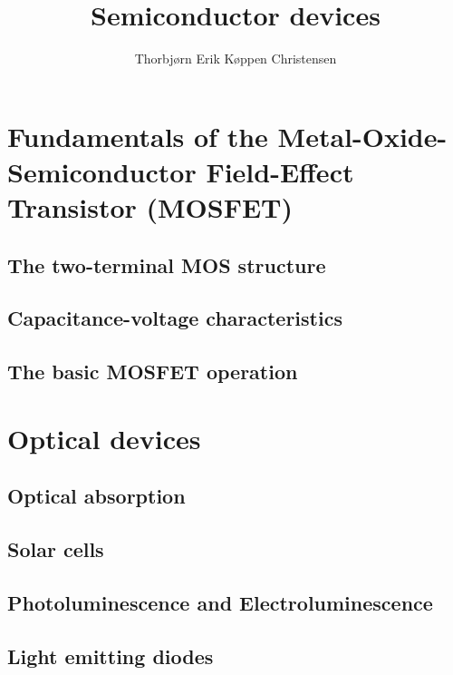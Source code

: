 \documentclass[article,oneside]{memoir}
\title{Semiconductor devices}
\author{Thorbjørn Erik Køppen Christensen}
\begin{document}
\maketitle
\part{Fundamentals of the Metal-Oxide-Semiconductor Field-Effect Transistor (MOSFET)}
\chapter{The two-terminal MOS structure}
\chapter{Capacitance-voltage characteristics}
\chapter{The basic MOSFET operation}
\part{Optical devices}
\chapter{Optical absorption}
\chapter{Solar cells}
\chapter{Photoluminescence and Electroluminescence}
\chapter{Light emitting diodes}
\end{document}
